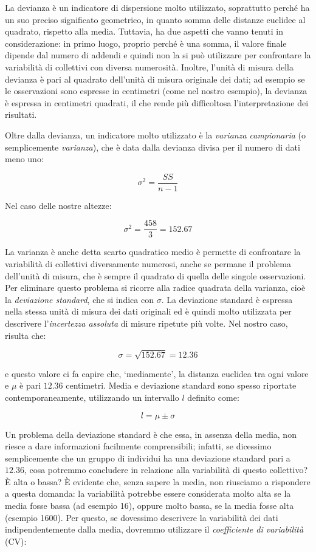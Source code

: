 \documentclass[a4paper,12pt,oneside]{book}
\begin{document}
La devianza è un indicatore di dispersione molto utilizzato, soprattutto perché ha un suo preciso significato geometrico, in quanto somma delle distanze euclidee al quadrato, rispetto alla media. Tuttavia, ha due aspetti che vanno tenuti in considerazione: in primo luogo, proprio perché è una somma, il valore finale dipende dal numero di addendi e quindi non la si può utilizzare per confrontare la variabilità di collettivi con diversa numerosità. Inoltre, l'unità di misura della devianza è pari al quadrato dell'unità di misura originale dei dati; ad esempio se le osservazioni sono espresse in centimetri (come nel nostro esempio), la devianza è espressa in centimetri quadrati, il che rende più difficoltosa l'interpretazione dei risultati.

Oltre dalla devianza, un indicatore molto utilizzato è la \emph{varianza campionaria} (o semplicemente \emph{varianza}), che è data dalla devianza divisa per il numero di dati meno uno:

\[\sigma^2  = \frac{SS}{n - 1}\]

Nel caso delle nostre altezze:

\[\sigma^2  = \frac{458}{3} = 152.67\]

La varianza è anche detta scarto quadratico medio è permette di confrontare la variabilità di collettivi diversamente numerosi, anche se permane il problema dell'unità di misura, che è sempre il quadrato di quella delle singole osservazioni. Per eliminare questo problema si ricorre alla radice quadrata della varianza, cioè la \emph{deviazione standard}, che si indica con \(\sigma\). La deviazione standard è espressa nella stessa unità di misura dei dati originali ed è quindi molto utilizzata per descrivere l'\emph{incertezza assoluta} di misure ripetute più volte. Nel nostro caso, risulta che:

\[\sigma  = \sqrt{152.67} = 12.36\]

e questo valore ci fa capire che, `mediamente', la distanza euclidea tra ogni valore e \(\mu\) è pari \(12.36\) centimetri. Media e deviazione standard sono spesso riportate contemporaneamente, utilizzando un intervallo \(l\) definito come:

\[l = \mu \pm \sigma\]

Un problema della deviazione standard è che essa, in assenza della media, non riesce a dare informazioni facilmente comprensibili; infatti, se dicessimo semplicemente che un gruppo di individui ha una deviazione standard pari a \(12.36\), cosa potremmo concludere in relazione alla variabilità di questo collettivo? È alta o bassa? È evidente che, senza sapere la media, non riusciamo a rispondere a questa domanda: la variabilità potrebbe essere considerata molto alta se la media fosse bassa (ad esempio 16), oppure molto bassa, se la media fosse alta (esempio 1600). Per questo, se dovessimo descrivere la variabilità dei dati indipendentemente dalla media, dovremmo utilizzare il \emph{coefficiente di variabilità} (CV):
\end{document}
